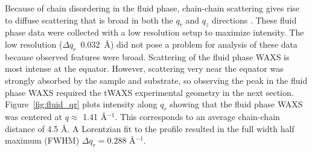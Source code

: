 Because of chain disordering in the fluid phase, chain-chain scattering
gives rise to diffuse scattering that is broad in both the $q_r$ and $q_z$ directions \cite{ref:Mills08}. 
These fluid phase data were collected with a low resolution setup to maximize
intensity. The low resolution ($\Delta q_r$~0.032~\AA) did not pose a problem for analysis of these 
data because observed features were broad.  Scattering of the fluid phase WAXS
is most intense at the equator. However, scattering very near the equator
was strongly absorbed by the sample and substrate, so observing the 
peak in the fluid phase WAXS required the tWAXS experimental 
geometry in the next section.  
Figure~\ref{fig:fluid_qr} plots intensity along $q_r$ showing that
the fluid phase WAXS was centered at $q \approx$ 1.41 \AA$^{-1}$. 
This corresponds to an average chain-chain distance of 4.5 \AA. 
A Lorentzian fit to the profile resulted in the full width half maximum
(FWHM) $\Delta q_r=0.288$ \AA$^{-1}$.

